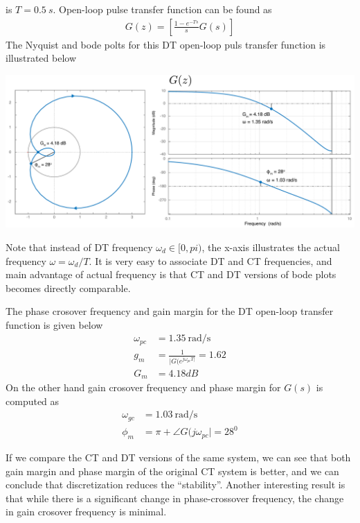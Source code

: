 \documentclass[twoside]{article}
\begin{document}
is $T = 0.5 \ s$. Open-loop pulse transfer function
can be found as
%
\begin{align*}
  G(z) = \left[ \frac{1 - e^{-Ts}}{s} G(s) \right] 
\end{align*}
%
The Nyquist and bode polts for this DT open-loop
puls transfer function is illustrated below
%
\begin{center}
\begin{minipage}[h]{\linewidth}
    \begin{center}
      \includegraphics[width=\textwidth]{Gd}
    \end{center}
\end{minipage}
\end{center}
%
Note that instead of DT frequency $\omega_d \in [0, pi)$,
the x-axis illustrates the actual frequency $\omega = \omega_d / T $.
It is very easy to associate DT and CT frequencies, and main advantage 
of actual frequency is that CT and DT versions of bode plots
becomes directly comparable.

The phase crosover frequency and gain margin for the DT open-loop
transfer function is given below
%
\begin{align*}
\omega_{pc} &= 1.35 \ \mathrm{rad/s} 
\\
g_m &= \frac{1}{| G(e^{j \omega_{pc} T|}} = 1.62
\\
G_m &= 4.18 dB
\end{align*}
%
On the other hand gain crosover frequency and phase margin 
for $G(s)$ is computed as
%
\begin{align*}
\omega_{gc} &= 1.03 \ \mathrm{rad/s} 
\\
\phi_m &= \pi + \angle G(j \omega_{pc}| = 28^0
\end{align*}

If we compare the CT and DT versions of the same system, we can see 
that both gain margin and phase margin of the original CT system is
better, and we can conclude that discretization reduces the
``stability''. Another interesting result is that while there is a
significant change in phase-crossover frequency, the change in gain
crosover frequency is minimal. 
\end{document}
